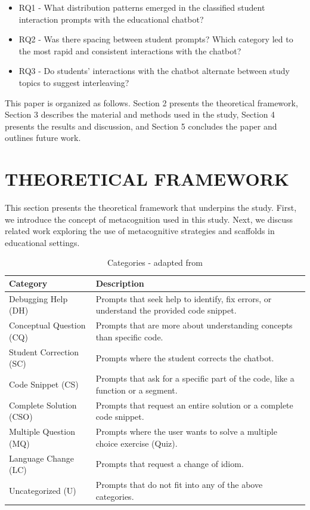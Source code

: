 \documentclass[a4paper,twoside]{article}
\begin{document}
\begin{itemize}
  \item RQ1 - What distribution patterns emerged in the classified student
  interaction prompts with the educational chatbot?
  \item RQ2 - Was there spacing between student prompts? Which category led to
  the most rapid and consistent interactions with the chatbot?
  \item RQ3 - Do students' interactions with the chatbot alternate between study
  topics to suggest interleaving?
\end{itemize}

This paper is organized as follows. Section 2 presents the theoretical
framework, Section 3 describes the material and methods used in the study,
Section 4 presents the results and discussion, and Section 5 concludes the
paper and outlines future work.

\section{\uppercase{Theoretical Framework}}

This section presents the theoretical framework that underpins the study. First,
we introduce the concept of metacognition used in this study. Next, we discuss
related work exploring the use of metacognitive strategies and scaffolds
in educational settings.

\begin{table}[htbp]
  \caption{Categories - adapted from \cite{Ghimire24}}
  \begin{center}
    \renewcommand{\arraystretch}{1.6} %
    \begin{tabular}{p{4cm} p{12cm}} %
      \hline
      \textbf{Category} & \textbf{Description} \\
      \hline
      Debugging Help (DH) & Prompts that seek help to identify, fix errors, or understand the provided code snippet. \\
      Conceptual Question (CQ) & Prompts that are more about understanding concepts than specific code. \\
      Student Correction (SC) & Prompts where the student corrects the chatbot. \\
      Code Snippet  (CS) & Prompts that ask for a specific part of the code, like a function or a segment. \\
      Complete Solution (CSO) & Prompts that request an entire solution or a complete code snippet. \\
      Multiple Question (MQ) & Prompts where the user wants to solve a multiple choice exercise (Quiz). \\
      Language Change (LC) & Prompts that request a change of idiom. \\
      Uncategorized (U) & Prompts that do not fit into any of the above categories. \\
      \hline
    \end{tabular}
    \label{tab:categories}
  \end{center}
\end{table}
\end{document}
